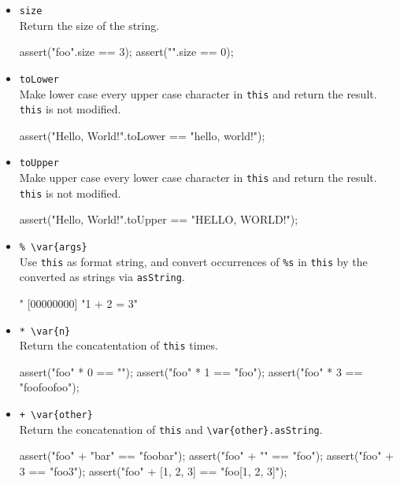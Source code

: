 \begin{itemize}
\item \lstinline|size|\\
  Return the size of the string.
\begin{urbiscript}
assert("foo".size == 3);
assert("".size == 0);
\end{urbiscript}

\item \lstinline|toLower|\\
  Make lower case every upper case character in \lstinline|this| and
  return the result.  \lstinline|this| is not modified.
\begin{urbiscript}
assert("Hello, World!".toLower == "hello, world!");
\end{urbiscript}

\item \lstinline|toUpper|\\
  Make upper case every lower case character in \lstinline|this| and
  return the result.  \lstinline|this| is not modified.
\begin{urbiscript}
assert("Hello, World!".toUpper == "HELLO, WORLD!");
\end{urbiscript}

\item \lstinline|% \var{args}|\\
  Use \lstinline|this| as format string, and convert occurrences of
  \lstinline|%s| in \lstinline|this| by the  converted as
  strings via \lstinline|asString|.
\begin{urbiscript}
"%
[00000000] "1 + 2 = 3"
\end{urbiscript}

\item \lstinline|* \var{n}|\\
  Return the concatentation of \lstinline|this|  times.
\begin{urbiscript}
assert("foo" * 0 == "");
assert("foo" * 1 == "foo");
assert("foo" * 3 == "foofoofoo");
\end{urbiscript}

\item \lstinline|+ \var{other}|\\
  Return the concatenation of \lstinline|this| and
  \lstinline|\var{other}.asString|.
\begin{urbiscript}
assert("foo" + "bar" == "foobar");
assert("foo" + "" == "foo");
assert("foo" + 3 == "foo3");
assert("foo" + [1, 2, 3] == "foo[1, 2, 3]");
\end{urbiscript}
\end{itemize}


